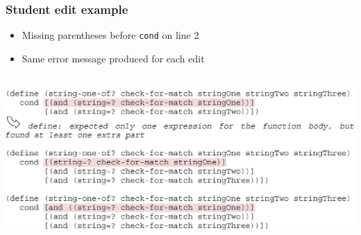 \documentclass{beamer}
\begin{document}


\begin{frame}
 \frametitle{Student edit example}
 \begin{itemize}
 \item Missing parentheses before \texttt{cond} on line 2
 \item Same error message produced for each edit
 \end{itemize}
      \
      \includegraphics[width=0.9\paperwidth]{RacketStudentEditPt1.pdf}
      		\\
\end{frame}
\end{document}
